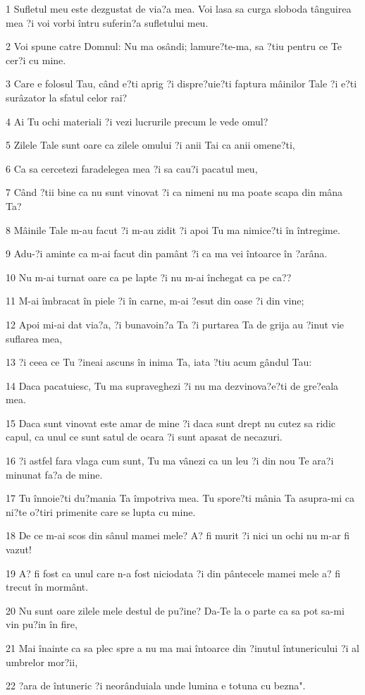 \par 1 Sufletul meu este dezgustat de via?a mea. Voi lasa sa curga sloboda tânguirea mea ?i voi vorbi întru suferin?a sufletului meu.
\par 2 Voi spune catre Domnul: Nu ma osândi; lamure?te-ma, sa ?tiu pentru ce Te cer?i cu mine.
\par 3 Care e folosul Tau, când e?ti aprig ?i dispre?uie?ti faptura mâinilor Tale ?i e?ti surâzator la sfatul celor rai?
\par 4 Ai Tu ochi materiali ?i vezi lucrurile precum le vede omul?
\par 5 Zilele Tale sunt oare ca zilele omului ?i anii Tai ca anii omene?ti,
\par 6 Ca sa cercetezi faradelegea mea ?i sa cau?i pacatul meu,
\par 7 Când ?tii bine ca nu sunt vinovat ?i ca nimeni nu ma poate scapa din mâna Ta?
\par 8 Mâinile Tale m-au facut ?i m-au zidit ?i apoi Tu ma nimice?ti în întregime.
\par 9 Adu-?i aminte ca m-ai facut din pamânt ?i ca ma vei întoarce în ?arâna.
\par 10 Nu m-ai turnat oare ca pe lapte ?i nu m-ai închegat ca pe ca??
\par 11 M-ai îmbracat în piele ?i în carne, m-ai ?esut din oase ?i din vine;
\par 12 Apoi mi-ai dat via?a, ?i bunavoin?a Ta ?i purtarea Ta de grija au ?inut vie suflarea mea,
\par 13 ?i ceea ce Tu ?ineai ascuns în inima Ta, iata ?tiu acum gândul Tau:
\par 14 Daca pacatuiesc, Tu ma supraveghezi ?i nu ma dezvinova?e?ti de gre?eala mea.
\par 15 Daca sunt vinovat este amar de mine ?i daca sunt drept nu cutez sa ridic capul, ca unul ce sunt satul de ocara ?i sunt apasat de necazuri.
\par 16 ?i astfel fara vlaga cum sunt, Tu ma vânezi ca un leu ?i din nou Te ara?i minunat fa?a de mine.
\par 17 Tu înnoie?ti du?mania Ta împotriva mea. Tu spore?ti mânia Ta asupra-mi ca ni?te o?tiri primenite care se lupta cu mine.
\par 18 De ce m-ai scos din sânul mamei mele? A? fi murit ?i nici un ochi nu m-ar fi vazut!
\par 19 A? fi fost ca unul care n-a fost niciodata ?i din pântecele mamei mele a? fi trecut în mormânt.
\par 20 Nu sunt oare zilele mele destul de pu?ine? Da-Te la o parte ca sa pot sa-mi vin pu?in în fire,
\par 21 Mai înainte ca sa plec spre a nu ma mai întoarce din ?inutul întunericului ?i al umbrelor mor?ii,
\par 22 ?ara de întuneric ?i neorânduiala unde lumina e totuna cu bezna".

